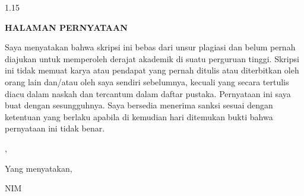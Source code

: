 \newpage
{}
{}
\begin{spacing}{1.15}
\begin{center}
    \textbf{HALAMAN PERNYATAAN}
\end{center}
\vspace{0.5cm}

Saya menyatakan bahwa skripsi ini bebas dari unsur plagiasi dan belum pernah diajukan untuk memperoleh derajat akademik di suatu perguruan tinggi. Skripsi ini tidak memuat karya atau pendapat yang pernah ditulis atau diterbitkan oleh orang lain dan/atau oleh saya sendiri sebelumnya, kecuali yang secara tertulis diacu dalam naskah dan tercantum dalam daftar pustaka. Pernyataan ini saya buat dengan sesungguhnya. Saya bersedia menerima sanksi sesuai dengan ketentuan yang berlaku apabila di kemudian hari ditemukan bukti bahwa pernyataan ini tidak benar.\par

\vspace{1.0cm}
\begin{flushright}
    \begin{minipage}{0.45\textwidth}
        \centering
        \cityname, \makebox[3cm]{\dotfill}\par
        Yang menyatakan,\par
        \vspace{2.0cm}
        \researchername\par
        NIM \researchernim
    \end{minipage}
\end{flushright}
\end{spacing}
